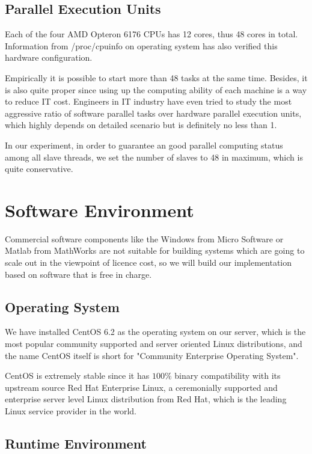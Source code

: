 \documentclass[12pt,a4]{report}
\begin{document}
\subsection{Parallel Execution Units}

Each of the four AMD Opteron 6176 CPUs has 12 cores, thus 48 cores in total. Information from /proc/cpuinfo on operating system has also verified this hardware configuration.

Empirically it is possible to start more than 48 tasks at the same time. Besides, it is also quite proper since using up the computing ability of each machine is a way to reduce IT cost. Engineers in IT industry have even tried to study the most aggressive ratio of software parallel tasks over hardware parallel execution units, which highly depends on detailed scenario but is definitely no less than 1.

In our experiment, in order to guarantee an good parallel computing status among all slave threads, we set the number of slaves to 48 in maximum, which is quite conservative.

\section{Software Environment}

Commercial software components like the Windows from Micro Software or Matlab from MathWorks are not suitable for building systems which are going to scale out in the viewpoint of licence cost, so we will build our implementation based on software that is free in charge.

\subsection{Operating System}

We have installed CentOS 6.2 as the operating system on our server, which is the most popular community supported and server oriented Linux distributions, and the name CentOS itself is short for "Community Enterprise Operating System".

CentOS is extremely stable since it has $100\%$ binary compatibility with its upstream source Red Hat Enterprise Linux, a ceremonially supported and enterprise server level Linux distribution from Red Hat, which is the leading Linux service provider in the world. 

\subsection{Runtime Environment}
\end{document}
